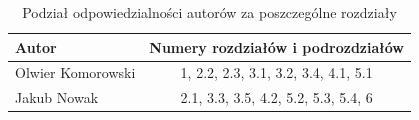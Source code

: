 \begin{table}[ht]
    \centering
    \caption{Podział odpowiedzialności autorów za poszczególne rozdziały}
    \label{tab:podzial_pracy}

    \begin{tabular}{|l|c|}
        \hline
        \rowcolor{gray!20}
        \textbf{Autor} & \textbf{Numery rozdziałów i podrozdziałów} \\ \hline
        Olwier Komorowski & 1, 2.2, 2.3, 3.1, 3.2, 3.4, 4.1, 5.1 \\ \hline
        Jakub Nowak & 2.1, 3.3, 3.5, 4.2, 5.2, 5.3, 5.4, 6 \\ \hline
    \end{tabular}
\end{table}